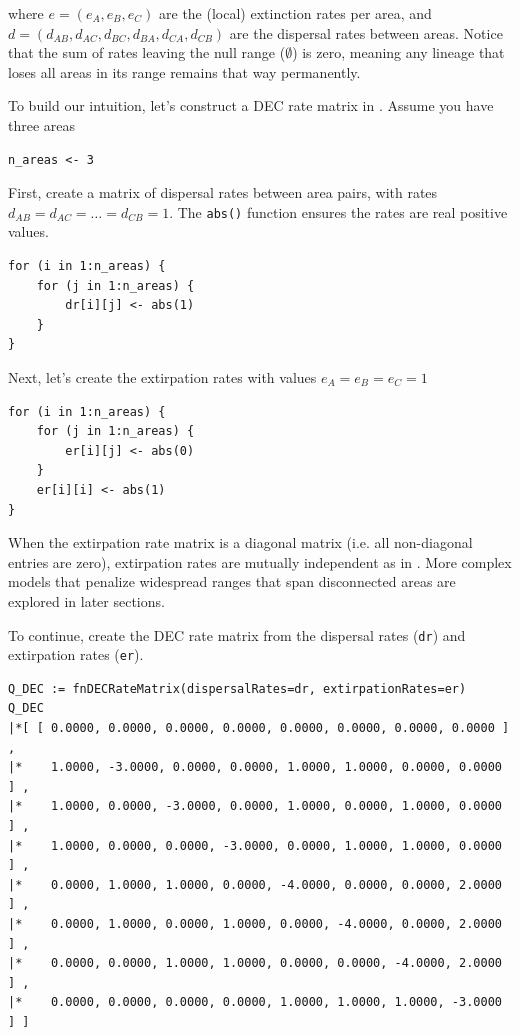where $e = ( e_A, e_B, e_C )$ are the (local) extinction rates per area, and $d = ( d_{AB}, d_{AC}, d_{BC}, d_{BA}, d_{CA}, d_{CB})$ are the dispersal rates between areas.
Notice that the sum of rates leaving the null range ($\emptyset$) is zero, meaning any lineage that loses all areas in its range remains that way permanently.

To build our intuition, let's construct a DEC rate matrix in \RevBayes.
Assume you have three areas

\begin{snugshade}
\begin{lstlisting}
n_areas <- 3
\end{lstlisting}
\end{snugshade}

First, create a matrix of dispersal rates between area pairs, with rates $d_{AB} = d_{AC} = \ldots = d_{CB} = 1$. The {\tt abs()} function ensures the rates are real positive values.

\begin{snugshade}
\begin{lstlisting}
for (i in 1:n_areas) {
    for (j in 1:n_areas) {
        dr[i][j] <- abs(1)
    }
}
\end{lstlisting}
\end{snugshade}

Next, let's create the extirpation rates with values $e_A=e_B=e_C=1$

\begin{snugshade}
\begin{lstlisting}
for (i in 1:n_areas) {
    for (j in 1:n_areas) {
        er[i][j] <- abs(0)
    }
    er[i][i] <- abs(1) 
}
\end{lstlisting}
\end{snugshade}

When the extirpation rate matrix is a diagonal matrix (i.e. all non-diagonal entries are zero), extirpation rates are mutually independent as in \citep{Ree2005}.
More complex models that penalize widespread ranges that span disconnected areas are explored in later sections.

To continue, create the DEC rate matrix from the dispersal rates ({\tt dr}) and extirpation rates ({\tt er}).

\begin{snugshade}
\begin{lstlisting}
Q_DEC := fnDECRateMatrix(dispersalRates=dr, extirpationRates=er)
Q_DEC
|*[ [ 0.0000, 0.0000, 0.0000, 0.0000, 0.0000, 0.0000, 0.0000, 0.0000 ] ,
|*    1.0000, -3.0000, 0.0000, 0.0000, 1.0000, 1.0000, 0.0000, 0.0000 ] ,
|*    1.0000, 0.0000, -3.0000, 0.0000, 1.0000, 0.0000, 1.0000, 0.0000 ] ,
|*    1.0000, 0.0000, 0.0000, -3.0000, 0.0000, 1.0000, 1.0000, 0.0000 ] ,
|*    0.0000, 1.0000, 1.0000, 0.0000, -4.0000, 0.0000, 0.0000, 2.0000 ] ,
|*    0.0000, 1.0000, 0.0000, 1.0000, 0.0000, -4.0000, 0.0000, 2.0000 ] ,
|*    0.0000, 0.0000, 1.0000, 1.0000, 0.0000, 0.0000, -4.0000, 2.0000 ] ,
|*    0.0000, 0.0000, 0.0000, 0.0000, 1.0000, 1.0000, 1.0000, -3.0000 ] ]
\end{lstlisting}
\end{snugshade}

